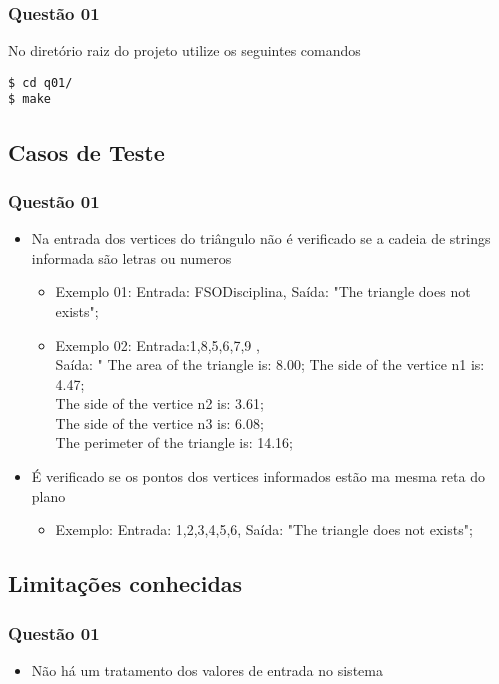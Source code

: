 \documentclass[11pt,a4paper]{article}
\begin{document}
\subsubsection{Questão 01}
No diretório raiz do projeto utilize os seguintes comandos
\begin{verbatim}
$ cd q01/
$ make
\end{verbatim}


\subsection{Casos de Teste}

\subsubsection{Questão 01}
\begin{itemize}
  \item Na entrada dos vertices do triângulo  não é verificado se a cadeia de
    strings informada são letras ou numeros
  \begin{itemize}
    \item Exemplo 01: Entrada: FSODisciplina, Saída: "The triangle does not exists";
    \item Exemplo 02: Entrada:1,8,5,6,7,9 , \\
    Saída: " The area of the triangle is: 8.00; The side of the vertice n1 is: 4.47; \\
    The side of the vertice n2 is: 3.61;\\
    The side of the vertice n3 is: 6.08;\\
    The perimeter of the triangle is: 14.16;\\
  \end{itemize}
\item É verificado se os pontos dos vertices informados estão ma mesma reta do plano
  \begin{itemize}
    \item Exemplo: Entrada: 1,2,3,4,5,6, Saída: "The triangle does not exists";
  \end{itemize}
\end{itemize}

\subsection{Limitações conhecidas}
\subsubsection{Questão 01}
\begin{itemize}
  \item Não há um tratamento dos valores de entrada no sistema
\end{itemize}
\end{document}
